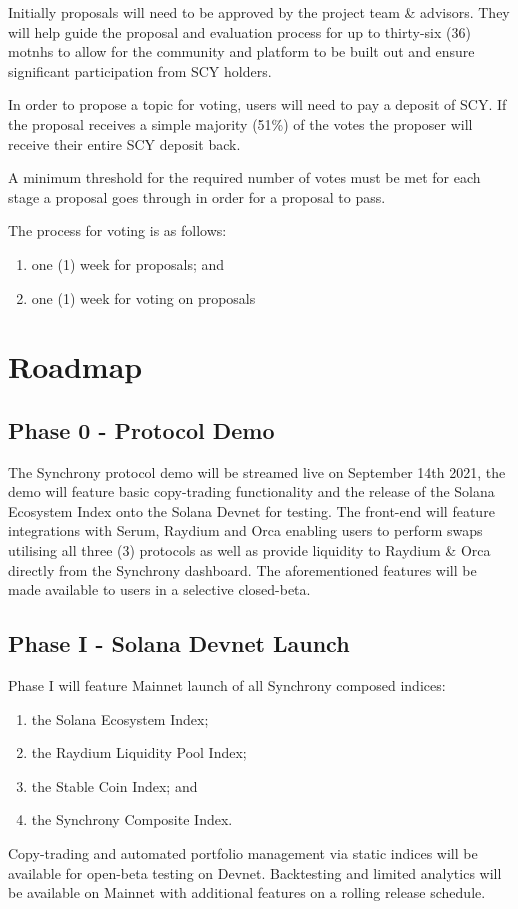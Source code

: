 \documentclass[10pt]{article}
\begin{document}
					Initially proposals will need to be approved by the project team \& advisors.
					They will help guide the proposal and evaluation process for up to thirty-six
					(36) motnhs to allow for the community and platform to be built out and ensure
					significant participation from SCY holders.

					In order to propose a topic for voting, users will need to pay a deposit of SCY.
					If the proposal receives a simple majority (51\%) of the votes the proposer
					will receive their entire SCY deposit back.

					A minimum threshold for the required number of votes must be met for each stage
					a proposal goes through in order for a proposal to pass.

					The process for voting is as follows:
					\begin{enumerate}
						\item one (1) week for proposals; and
						\item one (1) week for voting on proposals
					\end{enumerate}

					\section{Roadmap}
					\subsection{Phase 0 - Protocol Demo}
					The Synchrony protocol demo will be streamed live on September 14th 2021, the
					demo will feature basic copy-trading functionality and the release of the Solana
					Ecosystem Index onto the Solana Devnet for testing. The front-end will feature
					integrations with Serum, Raydium and Orca enabling users to perform swaps
					utilising all three (3) protocols as well as provide liquidity to Raydium \&
					Orca directly from the Synchrony dashboard. The aforementioned features will be
					made available to users in a selective closed-beta.

					\subsection{Phase I - Solana Devnet Launch}
					Phase I will feature Mainnet launch of all Synchrony composed indices:
					\begin{enumerate}
						\item the Solana Ecosystem Index;
						\item the Raydium Liquidity Pool Index;
						\item the Stable Coin Index; and
						\item the Synchrony Composite Index.
					\end{enumerate}
					Copy-trading and automated portfolio management via static indices will be
					available for open-beta testing on Devnet. Backtesting and limited analytics
					will be available on Mainnet with additional features on a rolling release
					schedule.
\end{document}
